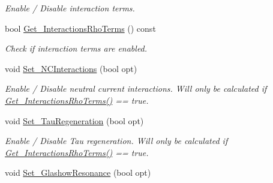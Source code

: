 \begin{DoxyCompactItemize}
\begin{DoxyCompactList}\small\item\em Enable / Disable interaction terms. \end{DoxyCompactList}\item 
bool \hyperlink{structcudanusquids_1_1ParameterObject_a71effd76b49ee99e45370d28c05f73ad}{Get\+\_\+\+Interactions\+Rho\+Terms} () const \hypertarget{structcudanusquids_1_1ParameterObject_a71effd76b49ee99e45370d28c05f73ad}{}\label{structcudanusquids_1_1ParameterObject_a71effd76b49ee99e45370d28c05f73ad}

\begin{DoxyCompactList}\small\item\em Check if interaction terms are enabled. \end{DoxyCompactList}\item 
void \hyperlink{structcudanusquids_1_1ParameterObject_a48fdc0ae44ad616da881d9f0039a5dc8}{Set\+\_\+\+N\+C\+Interactions} (bool opt)\hypertarget{structcudanusquids_1_1ParameterObject_a48fdc0ae44ad616da881d9f0039a5dc8}{}\label{structcudanusquids_1_1ParameterObject_a48fdc0ae44ad616da881d9f0039a5dc8}

\begin{DoxyCompactList}\small\item\em Enable / Disable neutral current interactions. Will only be calculated if \hyperlink{structcudanusquids_1_1ParameterObject_a71effd76b49ee99e45370d28c05f73ad}{Get\+\_\+\+Interactions\+Rho\+Terms()} == true. \end{DoxyCompactList}\item 
void \hyperlink{structcudanusquids_1_1ParameterObject_a365a78c6d394132eafa70beda0983684}{Set\+\_\+\+Tau\+Regeneration} (bool opt)\hypertarget{structcudanusquids_1_1ParameterObject_a365a78c6d394132eafa70beda0983684}{}\label{structcudanusquids_1_1ParameterObject_a365a78c6d394132eafa70beda0983684}

\begin{DoxyCompactList}\small\item\em Enable / Disable Tau regeneration. Will only be calculated if \hyperlink{structcudanusquids_1_1ParameterObject_a71effd76b49ee99e45370d28c05f73ad}{Get\+\_\+\+Interactions\+Rho\+Terms()} == true. \end{DoxyCompactList}\item 
void \hyperlink{structcudanusquids_1_1ParameterObject_ae5ba20ebc5761236832f08b4c982e59c}{Set\+\_\+\+Glashow\+Resonance} (bool opt)\hypertarget{structcudanusquids_1_1ParameterObject_ae5ba20ebc5761236832f08b4c982e59c}{}\label{structcudanusquids_1_1ParameterObject_ae5ba20ebc5761236832f08b4c982e59c}


\end{DoxyCompactItemize}

